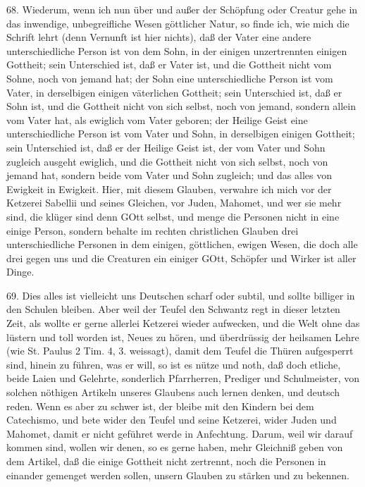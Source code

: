 68. Wiederum, wenn ich nun über und außer der Schöpfung oder Creatur gehe in das inwendige, unbegreifliche Wesen göttlicher Natur, so finde ich, wie mich die Schrift lehrt (denn Vernunft ist hier nichts), daß der Vater eine andere unterschiedliche Person ist von dem Sohn, in der einigen unzertrennten einigen Gottheit; sein Unterschied ist, daß er Vater ist, und die Gottheit nicht vom Sohne, noch von jemand hat; der Sohn eine unterschiedliche Person ist vom Vater, in derselbigen einigen väterlichen Gottheit; sein Unterschied ist, daß er Sohn ist, und die Gottheit nicht von sich selbst, noch von jemand, sondern allein vom Vater hat, als ewiglich vom Vater geboren; der Heilige Geist eine unterschiedliche Person ist vom Vater und Sohn, in derselbigen einigen Gottheit; sein Unterschied ist, daß er der Heilige Geist ist, der vom Vater und Sohn zugleich ausgeht ewiglich, und die Gottheit nicht von sich selbst, noch von jemand hat, sondern beide vom Vater und Sohn zugleich; und das alles von Ewigkeit in Ewigkeit. Hier, mit diesem Glauben, verwahre ich mich vor der Ketzerei Sabellii und seines Gleichen, vor Juden, Mahomet, und wer sie mehr sind, die klüger sind denn GOtt selbst, und menge die Personen nicht in eine einige Person, sondern behalte im rechten christlichen Glauben drei unterschiedliche Personen in dem einigen, göttlichen, ewigen Wesen, die doch alle drei gegen uns und die Creaturen ein einiger GOtt, Schöpfer und Wirker ist aller Dinge.

69. Dies alles ist vielleicht uns Deutschen scharf oder subtil, und sollte billiger in den Schulen bleiben. Aber weil der Teufel den Schwantz regt in dieser letzten Zeit, als wollte er gerne allerlei Ketzerei wieder aufwecken, und die Welt ohne das lüstern und toll worden ist, Neues zu hören, und überdrüssig der heilsamen Lehre (wie St. Paulus 2 Tim. 4, 3. weissagt), damit dem Teufel die Thüren aufgesperrt sind, hinein zu führen, was er will, so ist es nütze und noth, daß doch etliche, beide Laien und Gelehrte, sonderlich Pfarrherren, Prediger und Schulmeister, von solchen nöthigen Artikeln unseres Glaubens auch lernen denken, und deutsch reden. Wenn es aber zu schwer ist, der bleibe mit den Kindern bei dem Catechismo, und bete wider den Teufel und seine Ketzerei, wider Juden und Mahomet, damit er nicht geführet werde in Anfechtung. Darum, weil wir darauf kommen sind, wollen wir denen, so es gerne haben, mehr Gleichniß geben von dem Artikel, daß die einige Gottheit nicht zertrennt, noch die Personen in einander gemenget werden sollen, unsern Glauben zu stärken und zu bekennen.

